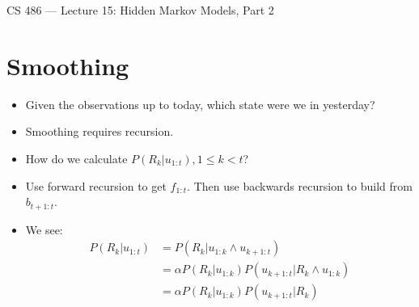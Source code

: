 \documentclass{article}
\author{Clement Tsang}
\begin{document}
\begin{center}
    \Large{CS 486 --- Lecture 15: Hidden Markov Models, Part 2}
\end{center}

\section{Smoothing}
\begin{itemize}
    \item Given the observations up to today, which state were we in yesterday?
    \item Smoothing requires recursion.
    \item How do we calculate $P(R_k|u_{1:t}), 1 \leq k < t$?
    \item Use forward recursion to get $f_{1:t}$.  Then use backwards recursion to build from $b_{t+1:t}$.
    \item We see:
        \begin{align*}
            P(R_k|u_{1:t}) &= P(R_k|u_{1:k} \wedge u_{k+1:t}) \\
                           &= \alpha P(R_k|u_{1:k})P(u_{k+1:t}|R_k \wedge u_{1:k}) \\
                           &= \alpha P(R_k | u_{1:k}) P(u_{k+1:t}|R_k)
        \end{align*}
\end{itemize}
\end{document}
